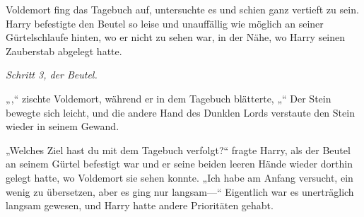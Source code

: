 Voldemort fing das Tagebuch auf, untersuchte es und schien ganz vertieft zu sein.
Harry befestigte den Beutel so leise und unauffällig wie möglich an seiner Gürtelschlaufe hinten, wo er nicht zu sehen war, in der Nähe, wo Harry seinen Zauberstab abgelegt hatte.

\emph{Schritt 3, der Beutel.}

„,“ zischte Voldemort, während er in dem Tagebuch blätterte, „“
Der Stein bewegte sich leicht, und die andere Hand des Dunklen Lords verstaute den Stein wieder in seinem Gewand.

„Welches Ziel hast du mit dem Tagebuch verfolgt?“ fragte Harry, als der Beutel an seinem Gürtel befestigt war und er seine beiden leeren Hände wieder dorthin gelegt hatte, wo Voldemort sie sehen konnte.
„Ich habe am Anfang versucht, ein wenig zu übersetzen, aber es ging nur langsam—“
Eigentlich war es unerträglich langsam gewesen, und Harry hatte andere Prioritäten gehabt.

